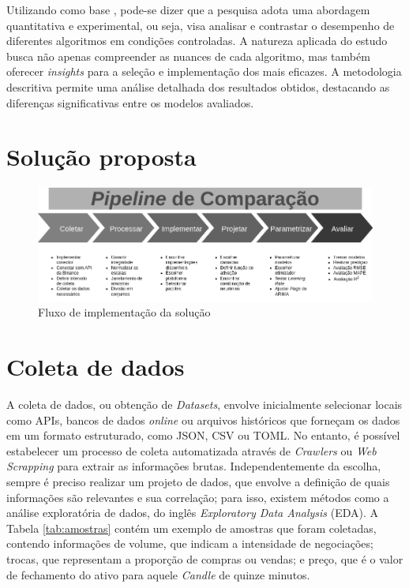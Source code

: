 Utilizando como base \textcite{pesquisa}, pode-se dizer que a pesquisa adota
uma abordagem quantitativa e experimental, ou seja, visa analisar e contrastar o desempenho
de diferentes algoritmos em condições controladas. A natureza aplicada do estudo busca não
apenas compreender as nuances de cada algoritmo, mas também oferecer \textit{insights} para a seleção
e implementação dos mais eficazes. A metodologia descritiva permite uma análise detalhada
dos resultados obtidos, destacando as diferenças significativas entre os modelos avaliados.

\section{Solução proposta} \label{sec:solucao}

\begin{figure}[!htb] \centering
    \caption{Fluxo de implementação da solução} \label{figura:proposta}
    \begin{varwidth}{\linewidth}
      \includegraphics[width=16cm]{figuras/proposta.png}
    \end{varwidth}
  \end{figure}

\section{Coleta de dados} \label{sec:coleta}
A coleta de dados, ou obtenção de \textit{Datasets}, envolve inicialmente selecionar locais como APIs, bancos de dados \textit{online} ou arquivos históricos que forneçam os dados em um formato estruturado, como JSON, CSV ou TOML.
No entanto, é possível estabelecer um processo de coleta automatizada através de \textit{Crawlers} ou \textit{Web Scrapping} para extrair as informações brutas.
Independentemente da escolha, sempre é preciso realizar um projeto de dados, que envolve a definição de quais informações são relevantes e sua correlação; para isso, existem métodos como a análise exploratória de dados, do inglês \textit{Exploratory Data Analysis} (EDA).
A Tabela \ref{tab:amostras} contém um exemplo de amostras que foram coletadas, contendo informações de volume, que indicam a intensidade de negociações; trocas, que representam a proporção de compras ou vendas; e preço, que é o valor de fechamento do ativo para aquele \textit{Candle} de quinze minutos.

